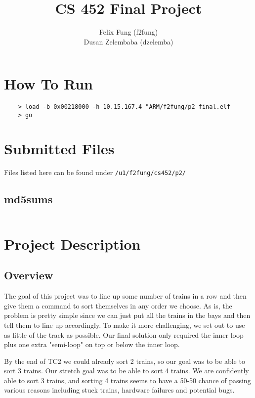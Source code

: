\documentclass[letterpaper]{article}
\begin{document}
\title{CS 452 Final Project}
\author{Felix Fung (f2fung) \\ Dusan Zelembaba (dzelemba)}
\maketitle

\section{How To Run}
\begin{verbatim}
	> load -b 0x00218000 -h 10.15.167.4 "ARM/f2fung/p2_final.elf
	> go
\end{verbatim}

\section{Submitted Files}

Files listed here can be found under \verb!/u1/f2fung/cs452/p2/!

\subsection{md5sums}
\begin{verbatim}

\end{verbatim}

\section{Project Description}

\subsection{Overview}

The goal of this project was to line up some number of trains in a row and then give them a command to sort themselves in any order we choose. As is, the problem is pretty simple since we can just put all the trains in the bays and then tell them to line up accordingly. To make it more challenging, we set out to use as little of the track as possible. Our final solution only required the inner loop plus one extra "semi-loop" on top or below the inner loop.

By the end of TC2 we could already sort 2 trains, so our goal was to be able to sort 3 trains. Our stretch goal was to be able to sort 4 trains. We are confidently able to sort 3 trains, and sorting 4 trains seems to have a 50-50 chance of passing various reasons including stuck trains, hardware failures and potential bugs.
\end{document}
